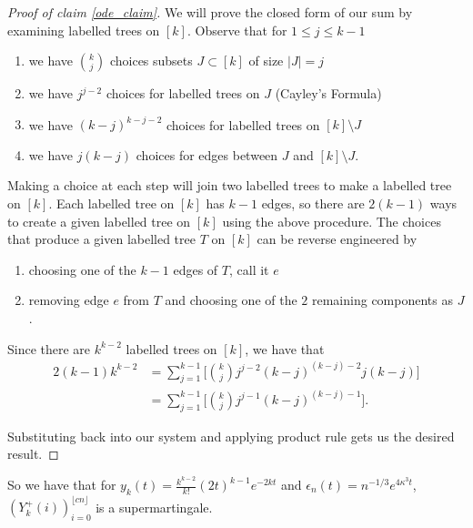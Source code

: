 \begin{proof}[Proof of claim \ref{ode_claim}]
    We will prove the closed form of our sum by examining labelled trees on \([k]\). Observe that for \(1 \leq  j \leq k-1\)
    \begin{enumerate}
        \item we have \(\binom{k}{j}\) choices subsets \(J \subset [k]\) of size \(|J| = j\)
        \item we have \(j^{j-2}\) choices for labelled trees on \(J\) (Cayley's Formula)
        \item we have \((k-j)^{k-j-2}\) choices for labelled trees on \([k] \setminus J\)
        \item we have \(j(k-j)\) choices for edges between \(J\) and \([k] \setminus J\).
    \end{enumerate}
    Making a choice at each step will join two labelled trees to make a labelled tree on \([k]\). Each labelled tree on \([k]\) has \(k-1\) edges, so there are \(2(k-1)\) ways to create a given labelled tree on \([k]\) using the above procedure. The choices that produce a given labelled tree \(T\) on \([k]\) can be reverse engineered by
    \begin{enumerate}
        \item choosing one of the \(k-1\) edges of \(T\), call it \(e\)
        \item removing edge \(e\) from \(T\) and choosing one of the \(2\) remaining components as \(J\).
    \end{enumerate}
    Since there are \(k^{k-2}\) labelled trees on \([k]\), we have that
    \begin{align*}
        2(k-1)k^{k-2} &= \sum\limits_{j=1}^{k-1} \Big[ \binom{k}{j} j^{j-2}(k-j)^{(k-j)-2} j(k-j)\Big] \\
        &= \sum\limits_{j=1}^{k-1} \Big[ \binom{k}{j} j^{j-1}(k-j)^{(k-j)-1}\Big].
    \end{align*}

    Substituting back into our system and applying product rule gets us the desired result.
\end{proof}

So we have that for \(y_{k}(t) = \frac{k^{k-2}}{k!}(2t)^{k-1} e^{-2kt}\) and \(\epsilon_{n}(t) = n^{-1/3} e^{4 \kappa^{3}t}\), \((Y^{+}_{k}(i))_{i=0}^{\lfloor {cn} \rfloor}\) is a supermartingale.

